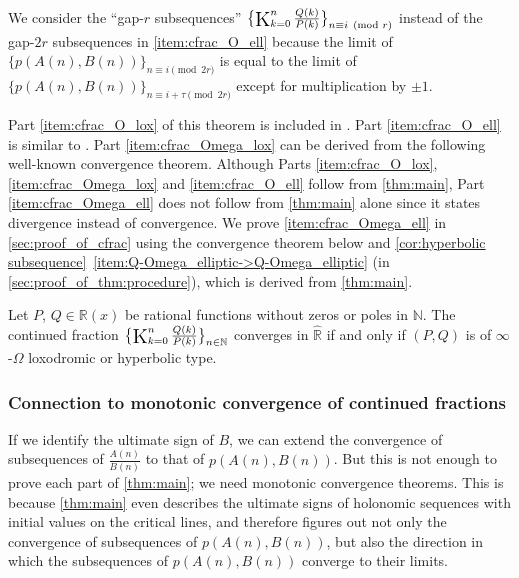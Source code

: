 \documentclass[a4paper,UKenglish,cleveref,autoref,thm-restate]{lipics-v2021}
\newcommand{\R}{\mathbb{R}}
\newcommand{\N}{\mathbb{N}}
\newcommand\Kettenbruch{\operatornamewithlimits{\mathchoice
     {\vcenter{\hbox{\huge $\mathrm{K}$}}}
     {\vcenter{\hbox{\Large $\mathrm{K}$}}}
     {\mathrm{K}}
     {\mathrm{K}}}}
\begin{document}
We consider the ``gap-$r$ subsequences'' $\bigl\{ \Kettenbruch _{k=0}^{n} \frac{Q(k)}{P(k)} \bigr\} _{n \equiv i \pmod{r}}$ instead of the gap-$2r$ subsequences in \eqref{item:cfrac_O_ell} 
because the limit of $\{ p(A(n), B(n)) \}_{n \equiv i \pmod{2r}}$ is equal to the limit of $\{ p(A(n), B(n)) \}_{n \equiv i+\tau \pmod{2r}}$ except for multiplication by $\pm1$.

Part \eqref{item:cfrac_O_lox} of this theorem is included in \cite[Theorems~3.12 and 3.13]{LW08}. 
Part \eqref{item:cfrac_O_ell} is similar to \cite[Lemma~4.28]{LW08}. 
Part \eqref{item:cfrac_Omega_lox} can be derived from the following well-known convergence theorem. Although Parts \eqref{item:cfrac_O_lox}, \eqref{item:cfrac_Omega_lox} and \eqref{item:cfrac_O_ell} follow from \cref{thm:main}, Part \eqref{item:cfrac_Omega_ell} does not follow from \cref{thm:main} alone since it states divergence instead of convergence. 
We prove \eqref{item:cfrac_Omega_ell} in \cref{sec:proof_of_cfrac} using the convergence theorem below and \cref{cor:hyperbolic subsequence}~\eqref{item:Q-Omega_elliptic->Q-Omega_elliptic} (in \cref{sec:proof_of_thm:procedure}), which is derived from \cref{thm:main}. 





\begin{theorem} \label{thm:cfrac_cconverge}
Let $P$, $Q \in \R(x)$ be rational functions without zeros or poles in $\N$. 
The continued fraction $\bigl\{ \Kettenbruch _{k=0}^n \frac{Q(k)}{P(k)} \bigr\}_{n \in \N}$ converges in $\hat{\R}$ 
if and only if $(P, Q)$ is of $\infty$-$\Omega$ loxodromic or hyperbolic type. 
\end{theorem}





\subsubsection{Connection to monotonic convergence of continued fractions}\label{sec:monotonic_convergence_thm}

If we identify the ultimate sign of $B$, we can extend the convergence of subsequences of $\frac{A(n)}{B(n)}$ to that of $p(A(n), B(n))$. 
But this is not enough to prove each part of \cref{thm:main}; we need monotonic convergence theorems. 
This is because \cref{thm:main} even describes the ultimate signs of holonomic sequences with initial values on the critical lines, and therefore figures out not only the convergence of subsequences of $p(A(n), B(n))$, but also the direction in which the subsequences of $p(A(n), B(n))$ converge to their limits. 
\end{document}
